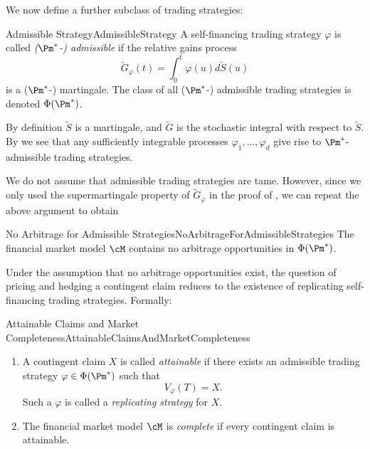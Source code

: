 We now define a further subclass of trading strategies:

\begin{defn}{Admissible Strategy}{AdmissibleStrategy}
	A self-financing trading strategy \(\varphi\) is called \textit{(\(\Pm^*\)-) admissible} if the relative gains process
	\[
		\tilde{G}_{\varphi}(t) = \int_0^t \varphi(u)d\tilde{S}(u)
	\]
	is a (\(\Pm^*\)-) martingale. The class of all (\(\Pm^*\)-) admissible trading strategies is denoted \(\Phi(\Pm^*)\).
\end{defn}

By definition \(\tilde{S}\) is a martingale, and \(\tilde{G}\) is the stochastic integral with respect to \(\tilde{S}\). By  we see that any sufficiently integrable processes \(\varphi_1, \dots, \varphi_d\) give rise to \(\Pm^*\)-admissible trading strategies.

We do not assume that admissible trading strategies are tame. However, since we only used the supermartingale property of \(\tilde{G}_{\varphi}\) in the proof of , we can repeat the above argument to obtain

\begin{thm}{No Arbitrage for Admissible Strategies}{NoArbitrageForAdmissibleStrategies}
	The financial market model \(\cM\) contains no arbitrage opportunities in \(\Phi(\Pm^*)\).
\end{thm}

Under the assumption that no arbitrage opportunities exist, the question of pricing and hedging a contingent claim reduces to the existence of replicating self-financing trading strategies. Formally:

\begin{defn}{Attainable Claims and Market Completeness}{AttainableClaimsAndMarketCompleteness}
	\begin{enumerate}[label=(\roman*), leftmargin=*]
		\item A contingent claim \(X\) is called \textit{attainable} if there exists an admissible trading strategy \(\varphi \in \Phi(\Pm^*)\) such that
		      \[
			      V_{\varphi}(T) = X.
		      \]
		      Such a \(\varphi\) is called a \textit{replicating strategy} for \(X\).
		\item The financial market model \(\cM\) is \textit{complete} if every contingent claim is attainable.
	\end{enumerate}
\end{defn}

